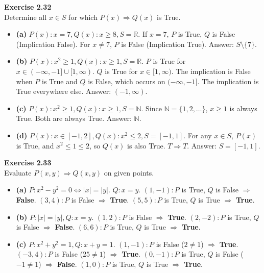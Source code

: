 \documentclass[11pt]{article}
\begin{document}
\vspace{10pt}
\textbf{Exercise 2.32} \\
Determine all $x \in S$ for which $P(x) \Rightarrow Q(x)$ is True.
\begin{itemize}
    \item \textbf{(a)} $P(x): x=7, Q(x): x \geq 8, S=\mathbb{R}$.
    If $x=7$, $P$ is True, $Q$ is False (Implication False). For $x \neq 7$, $P$ is False (Implication True). Answer: \textbf{$S \setminus \{7\}$}.
    \item \textbf{(b)} $P(x): x^2 \geq 1, Q(x): x \geq 1, S=\mathbb{R}$.
    $P$ is True for $x \in (-\infty, -1] \cup [1, \infty)$. $Q$ is True for $x \in [1, \infty)$. The implication is False when $P$ is True and $Q$ is False, which occurs on $(-\infty, -1]$. The implication is True everywhere else. Answer: \textbf{$(-1, \infty)$}.
    \item \textbf{(c)} $P(x): x^2 \geq 1, Q(x): x \geq 1, S=\mathbb{N}$.
    Since $\mathbb{N} = \{1, 2, \dots\}$, $x \geq 1$ is always True. Both are always True. Answer: \textbf{$\mathbb{N}$}.
    \item \textbf{(d)} $P(x): x \in [-1, 2], Q(x): x^2 \leq 2, S=[-1, 1]$.
    For any $x \in S$, $P(x)$ is True, and $x^2 \leq 1 \leq 2$, so $Q(x)$ is also True. $T \Rightarrow T$. Answer: \textbf{$S = [-1, 1]$}.
\end{itemize}

\vspace{10pt}
\textbf{Exercise 2.33} \\
Evaluate $P(x,y) \Rightarrow Q(x,y)$ on given points.
\begin{itemize}
    \item \textbf{(a)} $P: x^2-y^2=0 \Leftrightarrow |x|=|y|$. $Q: x=y$.
    $(1,-1): P$ is True, $Q$ is False $\Rightarrow$ \textbf{False}.
    $(3,4): P$ is False $\Rightarrow$ \textbf{True}.
    $(5,5): P$ is True, $Q$ is True $\Rightarrow$ \textbf{True}.
    
    \item \textbf{(b)} $P: |x|=|y|, Q: x=y$.
    $(1,2): P$ is False $\Rightarrow$ \textbf{True}.
    $(2,-2): P$ is True, $Q$ is False $\Rightarrow$ \textbf{False}.
    $(6,6): P$ is True, $Q$ is True $\Rightarrow$ \textbf{True}.
    
    \item \textbf{(c)} $P: x^2+y^2=1, Q: x+y=1$.
    $(1,-1): P$ is False ($2 \neq 1$) $\Rightarrow$ \textbf{True}.
    $(-3,4): P$ is False ($25 \neq 1$) $\Rightarrow$ \textbf{True}.
    $(0,-1): P$ is True, $Q$ is False ($-1 \neq 1$) $\Rightarrow$ \textbf{False}.
    $(1,0): P$ is True, $Q$ is True $\Rightarrow$ \textbf{True}.
\end{itemize}
\end{document}
